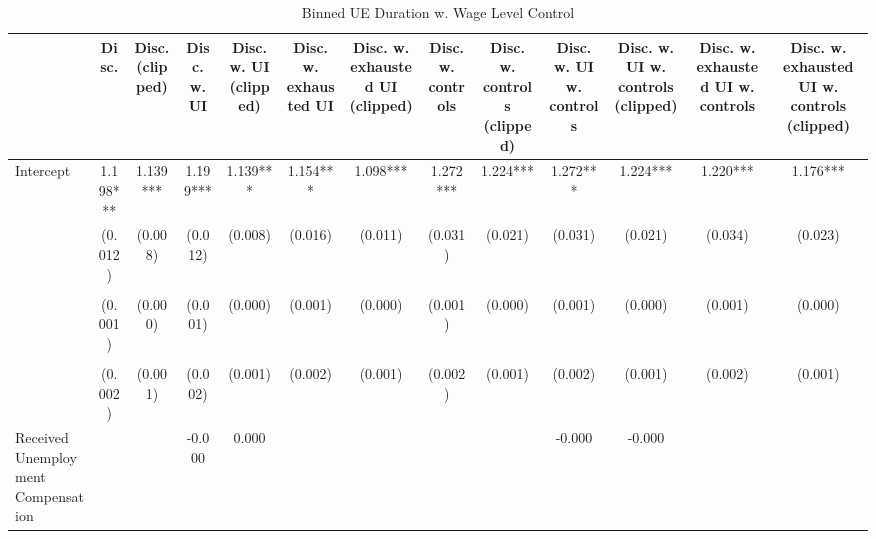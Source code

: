 \documentclass[
]{article}
\begin{document}
\begin{table}[t]
\caption{\label{tab:unnamed-chunk-32}Binned UE Duration w. Wage Level Control} 
\fontsize{12.0pt}{14.4pt}\selectfont
\begin{tabular*}{\linewidth}{@{\extracolsep{\fill}}lcccccccccccc}
\toprule
  & Disc. & Disc. (clipped) & Disc. w. UI & Disc. w. UI (clipped) & Disc. w. exhausted UI & Disc. w. exhausted UI (clipped) & Disc. w. controls & Disc. w. controls (clipped) & Disc. w. UI w. controls & Disc. w. UI w. controls (clipped) & Disc. w. exhausted UI w. controls & Disc. w. exhausted UI w. controls (clipped) \\ 
\midrule\addlinespace[2.5pt]
Intercept & 1.198*** & 1.139*** & 1.199*** & 1.139*** & 1.154*** & 1.098*** & 1.272*** & 1.224*** & 1.272*** & 1.224*** & 1.220*** & 1.176*** \\ 
 & (0.012) & (0.008) & (0.012) & (0.008) & (0.016) & (0.011) & (0.031) & (0.021) & (0.031) & (0.021) & (0.034) & (0.023) \\ 
{\cellcolor[HTML]{ADD8E6}{Hourly Wage of Lost Job}} & {\cellcolor[HTML]{ADD8E6}{-0.009***}} & {\cellcolor[HTML]{ADD8E6}{-0.006***}} & {\cellcolor[HTML]{ADD8E6}{-0.009***}} & {\cellcolor[HTML]{ADD8E6}{-0.006***}} & {\cellcolor[HTML]{ADD8E6}{-0.009***}} & {\cellcolor[HTML]{ADD8E6}{-0.006***}} & {\cellcolor[HTML]{ADD8E6}{-0.011***}} & {\cellcolor[HTML]{ADD8E6}{-0.007***}} & {\cellcolor[HTML]{ADD8E6}{-0.011***}} & {\cellcolor[HTML]{ADD8E6}{-0.007***}} & {\cellcolor[HTML]{ADD8E6}{-0.011***}} & {\cellcolor[HTML]{ADD8E6}{-0.007***}} \\ 
 & (0.001) & (0.000) & (0.001) & (0.000) & (0.001) & (0.000) & (0.001) & (0.000) & (0.001) & (0.000) & (0.001) & (0.000) \\ 
{\cellcolor[HTML]{ADD8E6}{Unemployment Duration (Binned)}} & {\cellcolor[HTML]{ADD8E6}{-0.011***}} & {\cellcolor[HTML]{ADD8E6}{-0.009***}} & {\cellcolor[HTML]{ADD8E6}{-0.011***}} & {\cellcolor[HTML]{ADD8E6}{-0.009***}} & {\cellcolor[HTML]{ADD8E6}{-0.008***}} & {\cellcolor[HTML]{ADD8E6}{-0.005***}} & {\cellcolor[HTML]{ADD8E6}{-0.011***}} & {\cellcolor[HTML]{ADD8E6}{-0.008***}} & {\cellcolor[HTML]{ADD8E6}{-0.010***}} & {\cellcolor[HTML]{ADD8E6}{-0.008***}} & {\cellcolor[HTML]{ADD8E6}{-0.007***}} & {\cellcolor[HTML]{ADD8E6}{-0.005***}} \\ 
 & (0.002) & (0.001) & (0.002) & (0.001) & (0.002) & (0.001) & (0.002) & (0.001) & (0.002) & (0.001) & (0.002) & (0.001) \\ 
Received Unemployment Compensation &  &  & -0.000 & 0.000 &  &  &  &  & -0.000 & -0.000 &  &  \\ 

\end{tabular*}
\end{table}
\end{document}
